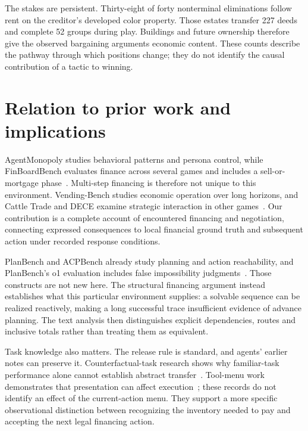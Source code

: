 The stakes are persistent. Thirty-eight of forty nonterminal eliminations follow rent on the creditor's developed color property. Those estates transfer 227 deeds and complete 52 groups during play. Buildings and future ownership therefore give the observed bargaining arguments economic content. These counts describe the pathway through which positions change; they do not identify the causal contribution of a tactic to winning.

\section{Relation to prior work and implications}
AgentMonopoly studies behavioral patterns and persona control, while FinBoardBench evaluates finance across several games and includes a sell-or-mortgage phase~\cite{wu2026agentmonopoly,hu2026finboardbench}. Multi-step financing is therefore not unique to this environment. Vending-Bench studies economic operation over long horizons, and Cattle Trade and DECE examine strategic interaction in other games~\cite{backlund2025vendingbench,muller2026cattletrade,zhang2026dece}. Our contribution is a complete account of encountered financing and negotiation, connecting expressed consequences to local financial ground truth and subsequent action under recorded response conditions.

PlanBench and ACPBench already study planning and action reachability, and PlanBench's o1 evaluation includes false impossibility judgments~\cite{valmeekam2023planbench,kokel2025acp,valmeekam2024o1}. Those constructs are not new here. The structural financing argument instead establishes what this particular environment supplies: a solvable sequence can be realized reactively, making a long successful trace insufficient evidence of advance planning. The text analysis then distinguishes explicit dependencies, routes and inclusive totals rather than treating them as equivalent.

Task knowledge also matters. The release rule is standard, and agents' earlier notes can preserve it. Counterfactual-task research shows why familiar-task performance alone cannot establish abstract transfer~\cite{wu2024reciting}. Tool-menu work demonstrates that presentation can affect execution~\cite{yan2026menu}; these records do not identify an effect of the current-action menu. They support a more specific observational distinction between recognizing the inventory needed to pay and accepting the next legal financing action.

